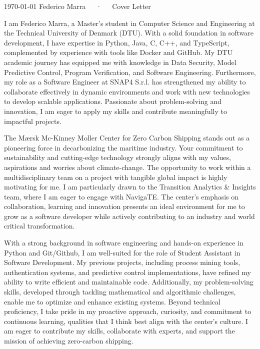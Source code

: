 \documentclass[11pt, a4paper]{awesome-cv}
\begin{document}
\makecvheader[R]

\makecvfooter
  {\today}
  {Federico Marra~~~·~~~Cover Letter}
  {}

\makelettertitle

\begin{cvletter}

I am Federico Marra, a Master's student in Computer Science and Engineering at the Technical University of Denmark (DTU). With a solid foundation in software development, I have expertise in Python, Java, C, C++, and TypeScript, complemented by experience with tools like Docker and GitHub. My DTU academic journey has equipped me with knowledge in Data Security, Model Predictive Control, Program Verification, and Software Engineering. Furthermore, my role as a Software Engineer at SNAP4 S.r.l. has strengthened my ability to collaborate effectively in dynamic environments and work with new technologies to develop scalable applications. Passionate about problem-solving and innovation, I am eager to apply my skills and contribute meaningfully to impactful projects.

The Mærsk Mc-Kinney Moller Center for Zero Carbon Shipping stands out as a pioneering force in decarbonizing the maritime industry. Your commitment to sustainability and cutting-edge technology strongly aligns with my values, aspirations and worries about climate-change. The opportunity to work within a multidisciplinary team on a project with tangible global impact is highly motivating for me. I am particularly drawn to the Transition Analytics \& Insights team, where I am eager to engage with NavigaTE. The center’s emphasis on collaboration, learning and innovation presents an ideal environment for me to grow as a software developer while actively contributing to an industry and world critical transformation.

With a strong background in software engineering and hands-on experience in Python and Git/Github, I am well-suited for the role of Student Assistant in Software Development. My previous projects, including process mining tools, authentication systems, and predictive control implementations, have refined my ability to write efficient and maintainable code. Additionally, my problem-solving skills, developed through tackling mathematical and algorithmic challenges, enable me to optimize and enhance existing systems. Beyond technical proficiency, I take pride in my proactive approach, curiosity, and commitment to continuous learning, qualities that I think best align with the center’s culture. I am eager to contribute my skills, collaborate with experts, and support the mission of achieving zero-carbon shipping.


\end{cvletter}
\end{document}
